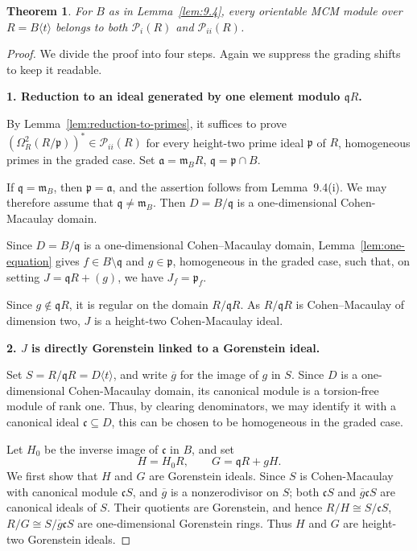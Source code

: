 \documentclass[11pt,letterpaper]{amsart}
\newcommand{\PiC}{\mathcal P_{i}}
\newcommand{\PiiC}{\mathcal P_{ii}}
\theoremstyle{plain}
\newtheorem{thm}{Theorem}[section]
\theoremstyle{definition}
\theoremstyle{remark}
\begin{document}
\begin{thm}\label{prop:one-variable}
For $B$ as in Lemma~\ref{lem:9.4}, every orientable MCM module over
$R=B\langle t\rangle$ belongs to both $\PiC(R)$ and $\PiiC(R)$.
\end{thm}

\begin{proof}
We divide the proof into four steps. Again we suppress the grading shifts to keep it readable.

\smallskip \noindent \textbf{1. Reduction to an ideal generated by one element modulo $\mathfrak qR$.}

By Lemma~\ref{lem:reduction-to-primes}, it suffices to prove $(\Omega_R^2(R/\mathfrak p))^* \in\mathcal P_{ii}(R)$ for every height-two prime ideal $\mathfrak p$ of $R$, homogeneous primes in the graded case. Set $\mathfrak a=\mathfrak m_B R$, $\mathfrak q=\mathfrak p \cap B$.

If $\mathfrak q=\mathfrak m_B$, then $\mathfrak p=\mathfrak a$, and the assertion follows from Lemma~9.4(i). We may therefore assume that $\mathfrak q\ne\mathfrak m_B$. Then $D=B/\mathfrak q$ is a one-dimensional Cohen-Macaulay domain.


Since $D=B/\mathfrak q$ is a one-dimensional Cohen--Macaulay
domain, Lemma~\ref{lem:one-equation} gives
$f\in B\setminus\mathfrak q$ and $g\in\mathfrak p$,
homogeneous in the graded case, such that, on setting
$J=\mathfrak qR+(g)$, we have $J_f=\mathfrak p_f$. 

Since $g\notin\mathfrak qR$, it is regular on the domain
$R/\mathfrak qR$. As $R/\mathfrak qR$ is Cohen--Macaulay
of dimension two, $J$ is a height-two Cohen-Macaulay ideal.


\smallskip \noindent \textbf{2. $J$ is directly Gorenstein linked to a Gorenstein ideal.}

Set $S=R/\mathfrak qR=D\langle t\rangle$, and write $\overline g$ for the image of $g$ in $S$. Since $D$ is a one-dimensional Cohen-Macaulay domain, its canonical module is a torsion-free module of rank one. Thus, by clearing denominators, we may identify it with a canonical ideal $\mathfrak c\subseteq D$, this can be chosen to be homogeneous in the graded case.

Let $H_0$ be the inverse image of $\mathfrak c$ in $B$, and set
\[
H=H_0R,\qquad G=\mathfrak qR+gH.
\]
We first show that $H$ and $G$ are Gorenstein ideals. Since $S$ is Cohen-Macaulay with
canonical module $\mathfrak cS$, and $\overline g$ is a nonzerodivisor on $S$; both $\mathfrak cS$ and $\overline g\mathfrak cS$ are canonical ideals of $S$. Their quotients are Gorenstein, and hence $R/H\cong S/\mathfrak cS$, $R/G\cong S/\overline g\mathfrak cS$ are one-dimensional Gorenstein rings. Thus $H$ and $G$ are height-two
Gorenstein ideals.


\end{proof}
\end{document}
